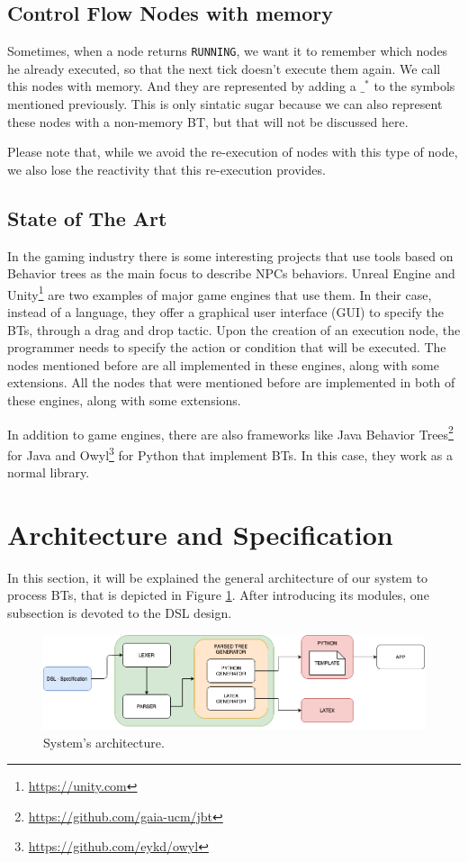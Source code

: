 \documentclass[a4paper,UKenglish,cleveref, autoref, thm-restate]{oasics-v2019}
\begin{document}
\subsection{Control Flow Nodes with memory}
Sometimes, when a node returns \texttt{RUNNING}, we want it to remember which nodes he already executed, so that the next tick doesn't execute them again.
We call this nodes with memory.
And they are represented by adding a $\_^*$ to the symbols mentioned previously.
This is only sintatic sugar because we can also represent these nodes with a non-memory BT, but that will not be discussed here.

Please note that, while we avoid the re-execution of nodes with this type of node, we also lose the reactivity that this re-execution provides.

\subsection{State of The Art}
\label{subsec:state-of-the-art}
In the gaming industry there is some interesting projects that use tools based on Behavior trees as the main focus to describe NPCs behaviors.
Unreal Engine \cite{UnrealEngine} and Unity\footnote{\raggedright\url{https://unity.com}} are two examples of major game engines that use them.
In their case, instead of a language, they offer a graphical user interface (GUI) to specify the BTs, through a drag and drop tactic.
Upon the creation of an execution node, the programmer needs to specify the action or condition that will be executed.
The nodes mentioned before are all implemented in these engines, along with some extensions.
All the nodes that were mentioned before are implemented in both of these engines, along with some extensions.

In addition to game engines, there are also frameworks like Java Behavior Trees\footnote{\url{https://github.com/gaia-ucm/jbt}} for Java and Owyl\footnote{\url{https://github.com/eykd/owyl}} for Python that implement BTs.
In this case, they work as a normal library.

\section{Architecture and Specification}
\label{sec:arc-spec}
In this section, it will be explained the general architecture of our system to process BTs, that is depicted in Figure \ref{fig:architecture}. After introducing its modules, one subsection is devoted to the DSL design.
\begin{figure}[H]
    \includegraphics[width=\columnwidth]{architecture.png}
    \caption{System's architecture.}
    \label{fig:architecture}
\end{figure}
\end{document}

